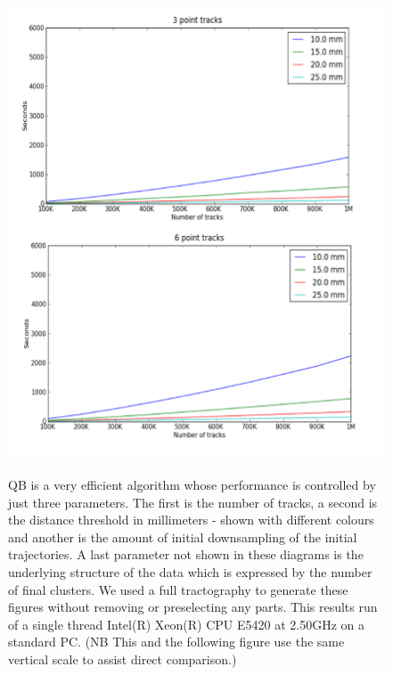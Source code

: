 \documentclass[preprint,authoryear,a4paper,10pt,onecolumn]{elsarticle}
\begin{document}
%
\begin{figure}
\begin{centering}
\label{Flo:Speed1}\includegraphics[scale=0.8]{last_figures/speed_3_6}
\par\end{centering}

\caption{QB is a very efficient algorithm whose performance is controlled by
just three parameters. The first is the number of tracks, a second
is the distance threshold in millimeters - shown with different colours
and another is the amount of initial downsampling of the initial trajectories.
A last parameter not shown in these diagrams is the underlying structure
of the data which is expressed by the number of final clusters. We
used a full tractography to generate these figures without removing
or preselecting any parts. This results run of a single thread Intel(R)
Xeon(R) CPU E5420 at 2.50GHz on a standard PC. (NB This and the following
figure use the same vertical scale to assist direct comparison.)}

\end{figure}
\end{document}
